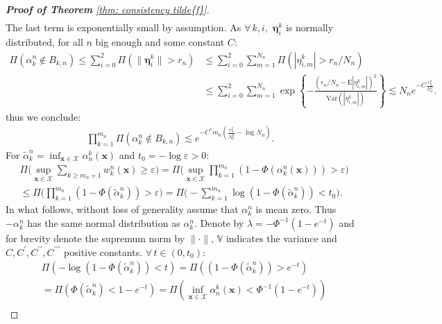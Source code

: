 \begin{proof}[\hypertarget{proof of thm consistency f tilde}{\textbf{Proof of Theorem}} \ref{thm: consistency tilde{f}}]
\begin{align*}
    \end{align*}
    The last term is exponentially small by assumption. As $\forall \, k,i, \, \,   \boldsymbol{\eta}_i^k$ is normally distributed, for all $n$ big enough and some constant $C$:
    \begin{align*}
        \Pi( \alpha^n_k \notin B_{k, n} ) \leq \sum_{i=0}^2 \Pi( \| \boldsymbol{\eta}_i^k \| > r_n ) &\leq \sum_{i=0}^2 \sum_{m=1}^{N_n} \Pi( | \eta_{i,m}^k | > r_n/N_n ) \\
        &\leq \sum_{i=0}^2 \sum_{m=1}^{N_n} \exp \left\{ - \frac{(r_n/N_n - \mathrm{E}| \eta_{i,m}^k |)^2}{\mathrm{Var}(| \eta_{i,m}^k |)}\right\} \lesssim N_n e^{-C\frac{r^2_n}{N^2_n}}.
    \end{align*}
    thus we conclude:
    \begin{align*}
        \prod_{k=1}^{m_n} \Pi( \alpha^n_k \notin B_{k, n} ) \lesssim e^{-C^{*} m_n (\frac{r_n^2}{N_n^2} - \log{N_n})}.
    \end{align*}
    For $\tilde{\alpha}^n_k = \inf_{\boldsymbol{x} \in \mathcal{X}} \alpha_n^k(\boldsymbol{x})$ and $t_0 = - \log{\varepsilon} >0$:
    \begin{align*}
        &\Pi \bigg( \sup _{\boldsymbol{x} \in \mathcal{X}} \sum_{k \geq m_n+1} w^n_k(\boldsymbol{x}) \geq \varepsilon \bigg) = \Pi \bigg( \sup _{\boldsymbol{x} \in \mathcal{X}} \prod_{k=1}^{m_n} (1 - \Phi(\alpha^n_k(\boldsymbol{x}))) > \varepsilon \bigg) \\
        &\leq \Pi \bigg( \prod_{k=1}^{m_n} ( 1 - \Phi(\tilde{\alpha}^n_k)) > \varepsilon \bigg) = \Pi \bigg( - \sum_{k=1}^{m_n} \log( 1 - \Phi(\tilde{\alpha}^n_k)) < t_0 \bigg).
    \end{align*}
    In what follows, without loss of generality assume that $\alpha_k^n$ is mean zero. Thus $-\alpha_k^n$ has the same normal distribution as $\alpha_k^n$. Denote by $\lambda=-\Phi^{-1}\left(1-e^{-t}\right)$ and for brevity denote the supremum norm by $\| \cdot \|$, $\mathbb{V}$ indicates the variance and $C, C^{\prime}, C^{\prime \prime}, C^{\prime \prime \prime}$ positive constants. $\forall \, t \in (0,t_0)$:
    \begin{align*}
        & \Pi\left(-\log \left(1-\Phi\left(\tilde{\alpha}^n_k\right)\right)<t\right) =\Pi\left(\left(1-\Phi\left(\tilde{\alpha}^n_k\right) \right)>e^{-t}\right) \\
        & =\Pi\left(\Phi\left(\tilde{\alpha}^n_k\right)<1-e^{-t}\right)=\Pi\left(\inf_{\boldsymbol{x} \in \mathcal{X}} \alpha_n^k(\boldsymbol{x})<\Phi^{-1}\left(1-e^{-t}\right)\right) \\

\end{align*}
\end{proof}
